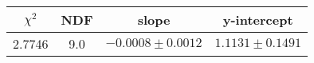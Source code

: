 \begin{tabular}{|c|c|c|c|}

\hline
$\chi^{2}$ & NDF & slope & y-intercept  \\
\hline
2.7746 & 9.0 & $-0.0008\pm0.0012$ & $1.1131\pm0.1491$ \\
\hline

\end{tabular}